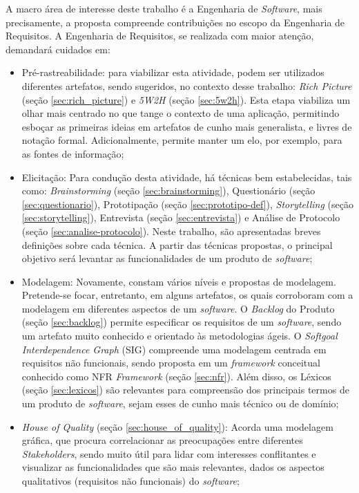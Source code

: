 A macro área de interesse deste trabalho é a Engenharia de \textit{Software}, mais precisamente, a proposta compreende contribuições no escopo da Engenharia de Requisitos. A Engenharia de Requisitos, se realizada com maior atenção, demandará cuidados em:

\begin{itemize}
    \item Pré-rastreabilidade: para viabilizar esta atividade, podem ser utilizados diferentes artefatos, sendo sugeridos, no contexto desse trabalho: \textit{Rich Picture} (seção \ref{sec:rich_picture}) e \textit{5W2H} (seção \ref{sec:5w2h}). Esta etapa viabiliza um olhar mais centrado no que tange o contexto de uma aplicação, permitindo esboçar as primeiras ideias em artefatos de cunho mais generalista, e livres de notação formal. Adicionalmente, permite manter um elo, por exemplo, para as fontes de informação;
    \item Elicitação: Para condução desta atividade, há técnicas bem estabelecidas, tais como: \textit{Brainstorming} (seção \ref{sec:brainstorming}), Questionário (seção \ref{sec:questionario}), Prototipação (seção \ref{sec:prototipo-def}), \textit{Storytelling} (seção \ref{sec:storytelling}), Entrevista (seção \ref{sec:entrevista}) e Análise de Protocolo (seção \ref{sec:analise-protocolo}). Neste trabalho, são apresentadas breves definições sobre cada técnica. A partir das técnicas propostas, o principal objetivo será levantar as funcionalidades de um produto de \textit{software};
    \item Modelagem: Novamente, constam vários níveis e propostas de modelagem. Pretende-se focar, entretanto, em alguns artefatos, os quais corroboram com a modelagem em diferentes aspectos de um \textit{software}. O \textit{Backlog} do Produto (seção \ref{sec:backlog}) permite especificar os requisitos de um \textit{software}, sendo um artefato muito conhecido e orientado às metodologias ágeis. O \textit{Softgoal Interdependence Graph} (SIG) compreende uma modelagem centrada em requisitos não funcionais, sendo proposta em um \textit{framework} conceitual conhecido como NFR \textit{Framework} (seção \ref{sec:nfr}). Além disso, os Léxicos (seção \ref{sec:lexicos}) são relevantes para compreensão dos principais termos de um produto de \textit{software}, sejam esses de cunho mais técnico ou de domínio;
    \item \textit{House of Quality} (seção \ref{sec:house_of_quality}): Acorda uma modelagem gráfica, que procura correlacionar as preocupações entre diferentes \textit{Stakeholders}, sendo muito útil para lidar com interesses conflitantes e visualizar as funcionalidades que são mais relevantes, dados os aspectos qualitativos (requisitos não funcionais) do \textit{software};

\end{itemize}
